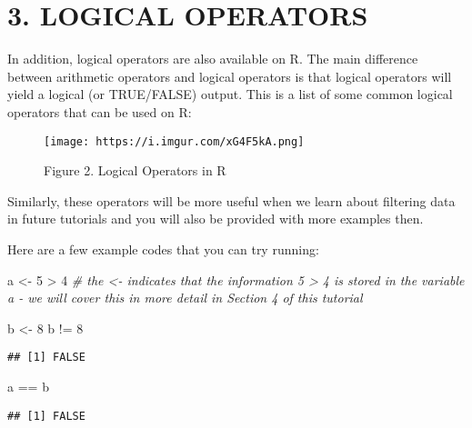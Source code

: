 \documentclass[
]{book}
\newenvironment{Shaded}{\begin{snugshade}}{\end{snugshade}}
\newcommand{\CommentTok}[1]{\textcolor[rgb]{0.56,0.35,0.01}{\textit{#1}}}
\newcommand{\DecValTok}[1]{\textcolor[rgb]{0.00,0.00,0.81}{#1}}
\newcommand{\NormalTok}[1]{#1}
\newcommand{\OtherTok}[1]{\textcolor[rgb]{0.56,0.35,0.01}{#1}}
\newcommand{\SpecialCharTok}[1]{\textcolor[rgb]{0.00,0.00,0.00}{#1}}
\begin{document}
\hypertarget{logical-operators}{%
\section{3. LOGICAL OPERATORS}\label{logical-operators}}

In addition, logical operators are also available on R. The main difference between arithmetic operators and logical operators is that logical operators will yield a logical (or TRUE/FALSE) output. This is a list of some common logical operators that can be used on R:

\begin{figure}
\centering
\texttt{[image: https://i.imgur.com/xG4F5kA.png]}
\caption{Figure 2. Logical Operators in R}
\end{figure}

Similarly, these operators will be more useful when we learn about filtering data in future tutorials and you will also be provided with more examples then.

Here are a few example codes that you can try running:

\begin{Shaded}
\begin{Highlighting}[]
\NormalTok{a }\OtherTok{\textless{}{-}} \DecValTok{5} \SpecialCharTok{\textgreater{}} \DecValTok{4}
    \CommentTok{\# the \textless{}{-} indicates that the information 5 \textgreater{} 4 is stored in the variable a {-} we will cover this in more detail in Section 4 of this tutorial}
\end{Highlighting}
\end{Shaded}

\begin{Shaded}
\begin{Highlighting}[]
\NormalTok{b }\OtherTok{\textless{}{-}} \DecValTok{8}
\NormalTok{b }\SpecialCharTok{!=} \DecValTok{8}
\end{Highlighting}
\end{Shaded}

\begin{verbatim}
## [1] FALSE
\end{verbatim}

\begin{Shaded}
\begin{Highlighting}[]
\NormalTok{a }\SpecialCharTok{==}\NormalTok{ b}
\end{Highlighting}
\end{Shaded}

\begin{verbatim}
## [1] FALSE
\end{verbatim}
\end{document}
